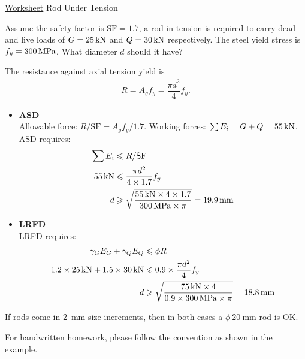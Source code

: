 \begin{exmp}\href{run:./WORKSHEET/CH01/EX1.UTRD.sm}{Worksheet}
Rod Under Tension

Assume the safety factor is $\mathrm{SF}=\num{1.7}$, a rod in tension is required to carry dead and live loads of $G=\SI{25}{\kilo\newton}$ and $Q=\SI{30}{\kilo\newton}$ respectively. The steel yield stress is $f_y=\SI{300}{\mega\pascal}$. What diameter $d$ should it have?
\begin{figure}[H]

\end{figure}
\end{exmp}
\begin{solution}
The resistance against axial tension yield is
\begin{gather*}
R=A_gf_y=\dfrac{\pi{}d^2}{4}f_y.
\end{gather*}
\begin{itemize}
\item \textbf{ASD}\\
Allowable force: $R/\mathrm{SF}=A_gf_y/\num{1.7}$. Working forces: $\sum{}E_i=G+Q=\SI{55}{\kilo\newton}$.\\
ASD requires:
\begin{align*}
\sum{}E_i&\leqslant{}R/\mathrm{SF}\\
\SI{55}{\kilo\newton}&\leqslant\dfrac{\pi{}d^2}{4\times1.7}f_y\\
d&\geqslant\sqrt{\dfrac{\SI{55}{\kilo\newton}\times4\times1.7}{\SI{300}{\mega\pascal}\times\pi}}=\SI{19.9}{\milli\meter}
\end{align*}
\item \textbf{LRFD}\\
LRFD requires:
\begin{align*}
\gamma_GE_G+\gamma_QE_Q&\leqslant\phi{}R\\
1.2\times\SI{25}{\kilo\newton}+1.5\times\SI{30}{\kilo\newton}&\leqslant0.9\times\dfrac{\pi{}d^2}{4}f_y\\
d&\geqslant\sqrt{\dfrac{\SI{75}{\kilo\newton}\times4}{0.9\times\SI{300}{\mega\pascal}\times\pi}}=\SI{18.8}{\milli\meter}
\end{align*}
\end{itemize}
If rods come in \SI{2}{\mm} size increments, then in both cases a $\phi~\SI{20}{\mm}$ rod is OK.
\end{solution}
\clearpage
For handwritten homework, please follow the convention as shown in the example.
